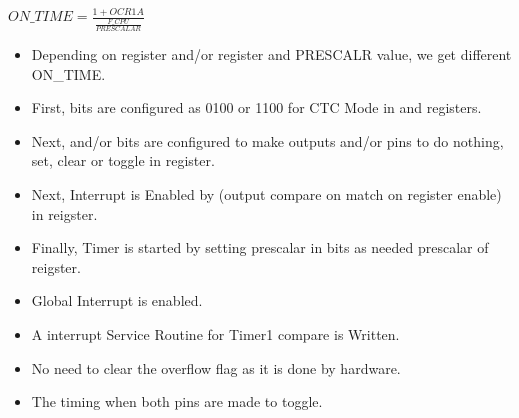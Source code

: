 \begin{center}
    $ON\_TIME = \frac{1 + OCR1A}{\frac{F\_CPU}{PRESCALAR}}$
\end{center}
\begin{itemize}
    \item Depending on  register and/or  register and PRESCALR value, we get different ON\_TIME.
    \item First,  bits are configured as 0100 or 1100 for CTC Mode in  and  registers.
    \item Next,  and/or  bits are configured to make outputs  and/or  pins to do nothing, set, clear or toggle in  register.
    \item Next, Interrupt is Enabled by  (output compare on match on  register enable) in  reigster.
    \item Finally, Timer is started by setting prescalar in  bits as needed prescalar of  reigster.
    \item Global Interrupt is enabled.
    \item A interrupt Service Routine for Timer1 compare is Written.
    \item No need to clear the overflow flag as it is done by hardware.
    \item The timing when both pins  are made to toggle.
\end{itemize}


